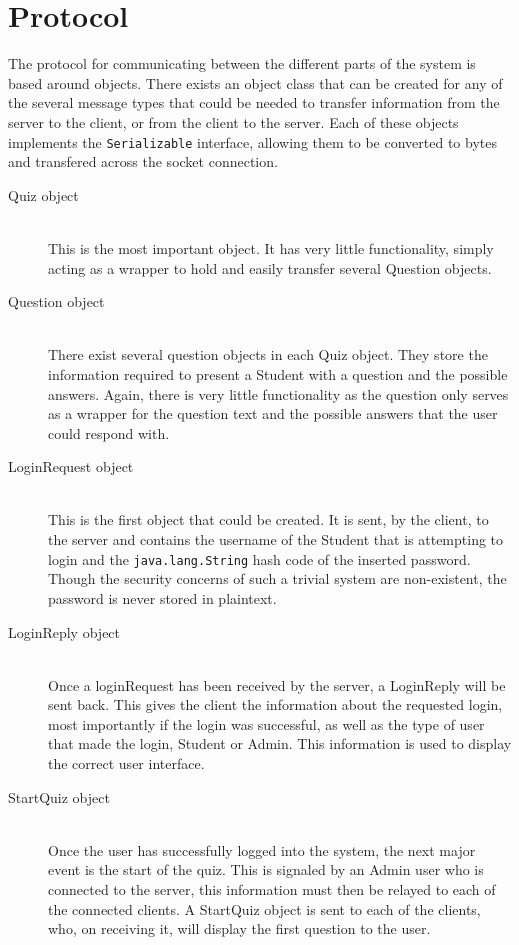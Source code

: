 \section{Protocol}
\label{sec:protocol}

The protocol for communicating between the different parts of the system is
based around objects. There exists an object class that can be created for any
of the several message types that could be needed to transfer information from
the server to the client, or from the client to the server. Each of these
objects implements the \texttt{Serializable} interface, allowing them to be
converted to bytes and transfered across the socket connection.

\begin{description}
	\item[Quiz object]\hfill \\ This is the most important object. It has very
		little functionality, simply acting as a wrapper to hold and easily
		transfer several Question objects.

	\item[Question object]\hfill \\ There exist several question objects in
		each Quiz object. They store the information required to present a
		Student with a question and the possible answers. Again, there is very
		little functionality as the question only serves as a wrapper for the
		question text and the possible answers that the user could respond
		with.

	\item[LoginRequest object]\hfill \\ This is the first object that could be
		created.  It is sent, by the client, to the server and contains the
		username of the Student that is attempting to login and the
		\texttt{java.lang.String} hash code of the inserted password. Though
		the security concerns of such a trivial system are non-existent, the
		password is never stored in plaintext.

	\item[LoginReply object]\hfill \\ Once a loginRequest has been received by
		the server, a LoginReply will be sent back. This gives the client the
		information about the requested login, most importantly if the login
		was successful, as well as the type of user that made the login,
		Student or Admin. This information is used to display the correct user
		interface.

	\item[StartQuiz object]\hfill \\ Once the user has successfully logged into
		the system, the next major event is the start of the quiz. This is
		signaled by an Admin user who is connected to the server, this
		information must then be relayed to each of the connected clients. A
		StartQuiz object is sent to each of the clients, who, on receiving it,
		will display the first question to the user.


\end{description}
